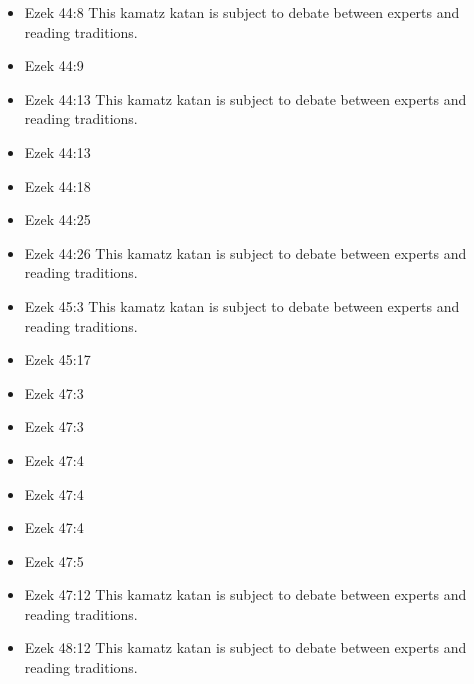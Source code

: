 \documentclass[14pt]{article}
\begin{document}
\begin{multicols}{2}
\begin{itemize}
														\item Ezek 44:8 This kamatz katan is subject to debate between experts and reading traditions.
														
														\item Ezek 44:9
														
														\item Ezek 44:13 This kamatz katan is subject to debate between experts and reading traditions.
														
														\item Ezek 44:13
														
														\item Ezek 44:18
														
														\item Ezek 44:25
														
														\item Ezek 44:26 This kamatz katan is subject to debate between experts and reading traditions.
														
														\item Ezek 45:3 This kamatz katan is subject to debate between experts and reading traditions.
														
														\item Ezek 45:17
														
														\item Ezek 47:3
														
														\item Ezek 47:3
														
														\item Ezek 47:4
														
														\item Ezek 47:4
														
														\item Ezek 47:4
														
														\item Ezek 47:5
														
														\item Ezek 47:12 This kamatz katan is subject to debate between experts and reading traditions.
														
														\item Ezek 48:12 This kamatz katan is subject to debate between experts and reading traditions.
														
													\end{itemize}\end{multicols}
\end{document}

